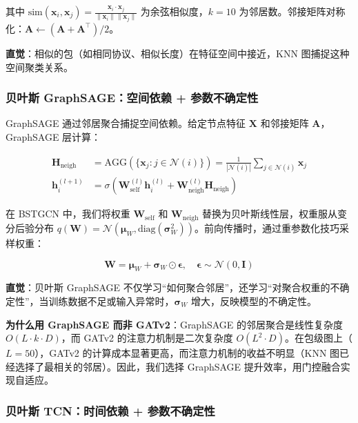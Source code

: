 其中 $\text{sim}(\mathbf{x}_i, \mathbf{x}_j) = \frac{\mathbf{x}_i \cdot \mathbf{x}_j}{\|\mathbf{x}_i\| \|\mathbf{x}_j\|}$ 为余弦相似度，$k=10$ 为邻居数。邻接矩阵对称化：$\mathbf{A} \leftarrow (\mathbf{A} + \mathbf{A}^\top) / 2$。

\textbf{直觉}：相似的包（如相同协议、相似长度）在特征空间中接近，KNN 图捕捉这种空间聚类关系。

\subsubsection{贝叶斯 GraphSAGE：空间依赖 + 参数不确定性}

GraphSAGE 通过邻居聚合捕捉空间依赖。给定节点特征 $\mathbf{X}$ 和邻接矩阵 $\mathbf{A}$，GraphSAGE 层计算：

\begin{align}
\mathbf{H}_{\text{neigh}} &= \text{AGG}(\{\mathbf{x}_j : j \in \mathcal{N}(i)\}) = \frac{1}{|\mathcal{N}(i)|} \sum_{j \in \mathcal{N}(i)} \mathbf{x}_j \\
\mathbf{h}_i^{(l+1)} &= \sigma\left( \mathbf{W}_{\text{self}}^{(l)} \mathbf{h}_i^{(l)} + \mathbf{W}_{\text{neigh}}^{(l)} \mathbf{H}_{\text{neigh}} \right)
\end{align}

在 BSTGCN 中，我们将权重 $\mathbf{W}_{\text{self}}$ 和 $\mathbf{W}_{\text{neigh}}$ 替换为贝叶斯线性层，权重服从变分后验分布 $q(\mathbf{W}) = \mathcal{N}(\boldsymbol{\mu}_W, \text{diag}(\boldsymbol{\sigma}_W^2))$。前向传播时，通过重参数化技巧采样权重：

\begin{equation}
\mathbf{W} = \boldsymbol{\mu}_W + \boldsymbol{\sigma}_W \odot \boldsymbol{\epsilon}, \quad \boldsymbol{\epsilon} \sim \mathcal{N}(0, \mathbf{I})
\end{equation}

\textbf{直觉}：贝叶斯 GraphSAGE 不仅学习``如何聚合邻居''，还学习``对聚合权重的不确定性''，当训练数据不足或输入异常时，$\boldsymbol{\sigma}_W$ 增大，反映模型的不确定性。

\textbf{为什么用 GraphSAGE 而非 GATv2}：GraphSAGE 的邻居聚合是线性复杂度 $O(L \cdot k \cdot D)$，而 GATv2 的注意力机制是二次复杂度 $O(L^2 \cdot D)$。在包级图上（$L=50$），GATv2 的计算成本显著更高，而注意力机制的收益不明显（KNN 图已经选择了最相关的邻居）。因此，我们选择 GraphSAGE 提升效率，用门控融合实现自适应。

\subsubsection{贝叶斯 TCN：时间依赖 + 参数不确定性}

